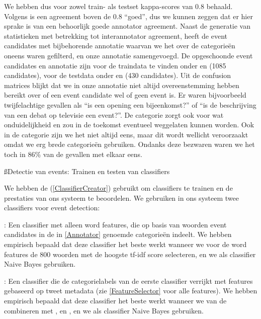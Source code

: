 {{We hebben dus voor zowel train- als testset kappa-scores van 0.8 behaald. Volgens \citeauthor{manning2008introduction} is 
een agreement boven de 0.8 ``goed'', dus we kunnen zeggen dat er hier sprake is van een behoorlijk goede annotator agreement.
\vl
Naast de generatie van statistieken met betrekking tot interannotator agreement, heeft  de event candidates
met bijbehorende annotatie waarvan we het over de categorie\"en oneens waren gefilterd, en onze 
annotatie samengevoegd. De opgeschoonde event candidates en annotatie zijn voor de traindata te vinden onder 
 en  (1085 candidates), voor de testdata onder 
 en  (430 candidates).
\vl
Uit de confusion matrices blijkt dat we in onze annotatie niet altijd overeenstemming hebben bereikt over of een event candidate
wel of geen event is. Er waren bijvoorbeeld twijfelachtige gevallen als 
``is een opening een bijeenkomst?'' of ``is de beschrijving van een debat op televisie een event?''. De categorie 
zorgt ook voor wat onduidelijkheid en zou in de toekomst eventueel weggelaten kunnen worden. Ook in de categorie 
zijn we het niet altijd eens, maar dit wordt wellicht veroorzaakt omdat we erg brede categorie\"en gebruiken. Ondanks deze bezwaren
waren we het toch in 86\% van de gevallen met elkaar eens.

\ss{Detectie van events: Trainen en testen van classifiers}

We hebben de  (\ref{ClassifierCreator}) gebruikt om classifiers te trainen en de prestaties van ons systeem te
beoordelen. We gebruiken in ons systeem twee classifiers voor event detection:
\begin{bullets}
\item {}: Een classifier met alleen word features, die op basis van woorden event candidates in de in \ref{Annotator} genoemde 
categorie\"en indeelt. We hebben empirisch bepaald dat deze classifier het beste werkt wanneer we voor de word features de
800 woorden met de hoogste tf-idf score selecteren, en we als classifier Naive Bayes gebruiken.
\item {}: Een classifier die de categorielabels van de eerste classifier verrijkt met features gebaseerd op tweet metadata (zie \ref{FeatureSelector}
voor alle features). We hebben empirisch bepaald dat deze classifier het beste werkt wanneer we  van de 
combineren met ,  en , en we als classifier Naive Bayes gebruiken.
\end{bullets}

}}
